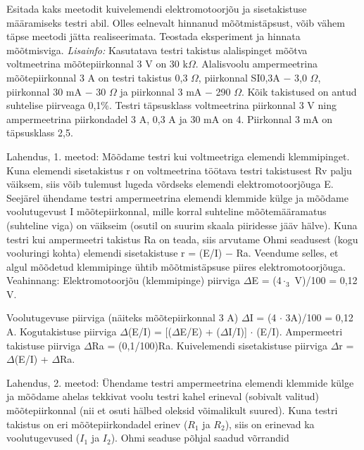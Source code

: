 
Esitada kaks meetodit kuivelemendi elektromotoorjõu ja sisetakistuse määramiseks testri abil. Olles eelnevalt hinnanud mõõtmistäpsust, võib vähem täpse meetodi jätta realiseerimata. Teostada eksperiment ja hinnata mõõtmisviga.
\textit{Lisainfo:} Kasutatava testri takistus alalispinget mõõtva voltmeetrina mõõtepiirkonnal 3 V on 30 k$\Omega$. Alalisvoolu ampermeetrina mõõtepiirkonnal 3 A on testri takistus 0,3 $\Omega$, piirkonnal SI0,3A $-$ 3,0 $\Omega$, piirkonnal 30 mA $-$ 30 $\Omega$ ja piirkonnal 3 mA $-$ 290 $\Omega$. Kõik takistused on antud suhtelise piirveaga 0,1\%. Testri täpsusklass voltmeetrina piirkonnal 3 V ning ampermeetrina piirkondadel 3 A, 0,3 A ja 30 mA on 4. Piirkonnal 3 mA on täpsusklass 2,5.

\hint

\solu
Lahendus, 1. meetod: Mõõdame testri kui voltmeetriga elemendi klemmipinget. Kuna elemendi sisetakistus r on voltmeetrina töötava testri takistusest Rv palju väiksem, siis võib tulemust lugeda võrdseks elemendi elektromotoorjõuga E. Seejärel ühendame testri ampermeetrina elemendi klemmide külge ja mõõdame voolutugevust I mõõtepiirkonnal, mille korral suhteline mõõtemääramatus (suhteline viga) on väikseim (osutil on suurim skaala piiridesse jääv hälve). Kuna testri kui ampermeetri takistus Ra on teada, siis arvutame Ohmi seadusest (kogu vooluringi kohta) elemendi sisetakistuse r = (E/I) $-$ Ra. Veendume selles, et algul mõõdetud klemmipinge ühtib mõõtmistäpsuse piires elektromotoorjõuga. Veahinnang: Elektromotoorjõu (klemmipinge) piirviga $\Delta$E = (4$\cdot_3$ V)/100 = 0,12 V.

Voolutugevuse piirviga (näiteks mõõtepiirkonnal 3 A) $\Delta$I = (4 $\cdot$ 3A)/100 = 0,12 A. Kogutakistuse piirviga $\Delta$(E/I) = [($\Delta$E/E) + ($\Delta$I/I)] $\cdot$ (E/I). Ampermeetri takistuse piirviga $\Delta$Ra = (0,1/100)Ra. Kuivelemendi sisetakistuse piirviga $\Delta$r = $\Delta$(E/I) + $\Delta$Ra.

Lahendus, 2. meetod: Ühendame testri ampermeetrina elemendi klemmide külge ja mõõdame ahelas tekkivat voolu testri kahel erineval (sobivalt valitud) mõõtepiirkonnal (nii et osuti hälbed oleksid võimalikult suured). Kuna testri takistus on eri mõõtepiirkondadel erinev ($R_1$ ja $R_2$), siis on erinevad ka voolutugevused ($I_1$ ja $I_2$). Ohmi seaduse põhjal saadud võrrandid

